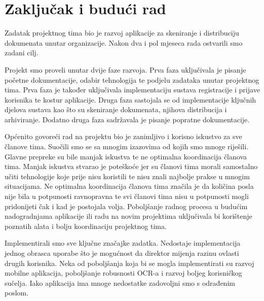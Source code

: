\chapter{Zaključak i budući rad}
		
		
		 
		 	Zadatak projektnog tima bio je razvoj aplikacije za skeniranje i
		 distribuciju dokumenata unutar organizacije. Nakon dva i pol mjeseca rada ostvarili smo zadani cilj. \newline
		 	
			Projekt smo proveli unutar dvije faze razvoja. Prva faza uključivala
		je pisanje početne dokumentacije, odabir tehnologija te podjelu zadataka unutar projektnog tima. Prva faza je također uključivala implementaciju sustava registracije i prijave korisnika te kostur aplikacije. Druga faza sastojala se od implementacije ključnih djelova sustava kao što su skeniranje dokumenata, njihova distribucija i arhiviranje. Dodatno druga faza sadržavala je pisanje popratne dokumentacije.\newline
		 	
		 	Općenito govoreći rad na projektu bio je zanimljivo i korisno iskustvo
		 za sve članove tima. Suočili smo se sa mnogim izazovima od kojih smo mnoge riješili. Glavne prepreke su bile manjak iskustva te ne optimalna koordinacija članova tima. Manjak iskustva stvarao je poteškoće jer su članovi tima morali samostalno učiti tehnologije koje prije nisu koristili te nisu znali najbolje prakse u mnogim situacijama. Ne optimalna koordinacija članova tima značila je da količina posla nije bila u potpunosti ravnopravna te svi članovi tima nisu u potpunosti mogli pridonijeti čak i kad je postojala volja. Poboljšanje radnog procesa u budućim nadogradnjama aplikacije ili radu na novim projektima uključivala bi korištenje poznatih alata i bolju koordinaciju projektnog tima. \newline
		 
		 Implementirali smo sve ključne značajke zadatka. Nedostaje implementacija jednog obrasca uporabe što je mogućnost da direktor mijenja razinu ovlasti drugih korisnika. Neka od poboljšanja koja bi se mogla implementirati su razvoj mobilne aplikacija, poboljšanje robusnosti OCR-a i razvoj boljeg korisničkog sučelja. Iako aplikacija ima mnoge nedostatke zadovoljni smo s odrađenim poslom. 
		 	 
		 	
		
		\eject 